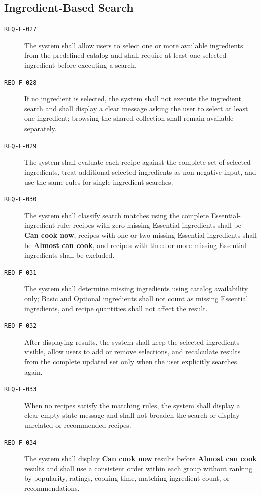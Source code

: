 \documentclass[12pt]{article}
\begin{document}
\subsection{Ingredient-Based Search}
\begin{description}
    \item[\texttt{REQ-F-027}] The system shall allow users to select one or more available ingredients from the predefined catalog and shall require at least one selected ingredient before executing a search.
    \item[\texttt{REQ-F-028}] If no ingredient is selected, the system shall not execute the ingredient search and shall display a clear message asking the user to select at least one ingredient; browsing the shared collection shall remain available separately.
    \item[\texttt{REQ-F-029}] The system shall evaluate each recipe against the complete set of selected ingredients, treat additional selected ingredients as non-negative input, and use the same rules for single-ingredient searches.
    \item[\texttt{REQ-F-030}] The system shall classify search matches using the complete Essential-ingredient rule: recipes with zero missing Essential ingredients shall be \textbf{Can cook now}, recipes with one or two missing Essential ingredients shall be \textbf{Almost can cook}, and recipes with three or more missing Essential ingredients shall be excluded.
    \item[\texttt{REQ-F-031}] The system shall determine missing ingredients using catalog availability only; Basic and Optional ingredients shall not count as missing Essential ingredients, and recipe quantities shall not affect the result.
    \item[\texttt{REQ-F-032}] After displaying results, the system shall keep the selected ingredients visible, allow users to add or remove selections, and recalculate results from the complete updated set only when the user explicitly searches again.
    \item[\texttt{REQ-F-033}] When no recipes satisfy the matching rules, the system shall display a clear empty-state message and shall not broaden the search or display unrelated or recommended recipes.
    \item[\texttt{REQ-F-034}] The system shall display \textbf{Can cook now} results before \textbf{Almost can cook} results and shall use a consistent order within each group without ranking by popularity, ratings, cooking time, matching-ingredient count, or recommendations.
\end{description}
\end{document}

